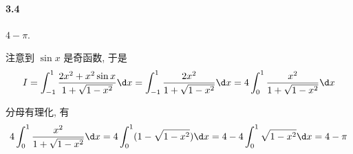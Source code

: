 \paragraph*{3.4} $4 - \pi$.

注意到 $\sin x$ 是奇函数, 于是
\[
	I = \int_{-1}^{1}\dfrac{2x^2 + x^2\sin x}{1 + \sqrt{1 - x^2}}\d x = \int_{-1}^{1} \dfrac{2x^2}{1 + \sqrt{1 - x^2}}\d x
	= 4\int_{0}^{1} \dfrac{x^2}{1 + \sqrt{1 - x^2}} \d x
\]

分母有理化, 有
\[
	4\int_{0}^{1} \dfrac{x^2}{1 + \sqrt{1 - x^2}} \d x = 4\int_{0}^{1} (1 - \sqrt{1 - x^2})\d x=4-4\int_{0}^{1}\sqrt{1 - x^2}\d x=4-\pi
\]